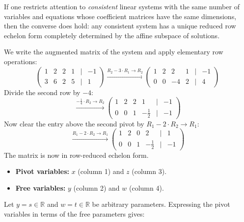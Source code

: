 \begin{exercisesolution}
\begin{remark}
If one restricts attention to \emph{consistent} linear systems with the same number of variables and equations whose coefficient matrices have the same dimensions, then the converse does hold: any consistent system has a unique reduced row echelon form completely determined by the affine subspace of solutions.
\end{remark}
\end{exercisesolution}

\begin{exercisesolution*}
\label{sol:gauss_elimination_4vars}
We write the augmented matrix of the system and apply elementary row operations:
\[
\begin{pmatrix}
1 & 2 & 2 & 1 & \big| & -1 \\
3 & 6 & 2 & 5 & \big| & 1
\end{pmatrix}
\xrightarrow{R_2 - 3 \cdot R_1 \to R_2}
\begin{pmatrix}
1 & 2 & 2 & 1 & \big| & -1 \\
0 & 0 & -4 & 2 & \big| & 4
\end{pmatrix}
\]
Divide the second row by $-4$:
\[
\xrightarrow{-\frac{1}{4} \cdot R_2 \to R_2}
\begin{pmatrix}
1 & 2 & 2 & 1 & \big| & -1 \\
0 & 0 & 1 & -\frac{1}{2} & \big| & -1
\end{pmatrix}
\]
Now clear the entry above the second pivot by $R_1 - 2 \cdot R_2 \to R_1$:
\[
\xrightarrow{R_1 - 2 \cdot R_2 \to R_1}
\begin{pmatrix}
1 & 2 & 0 & 2 & \big| & 1 \\
0 & 0 & 1 & -\frac{1}{2} & \big| & -1
\end{pmatrix}
\]
The matrix is now in row-reduced echelon form. 
\begin{itemize}
    \item \textbf{Pivot variables:} $x$ (column 1) and $z$ (column 3).
    \item \textbf{Free variables:} $y$ (column 2) and $w$ (column 4).
\end{itemize}
Let $y = s \in \mathbb{R}$ and $w = t \in \mathbb{R}$ be arbitrary parameters. Expressing the pivot variables in terms of the free parameters gives:

\end{exercisesolution*}
